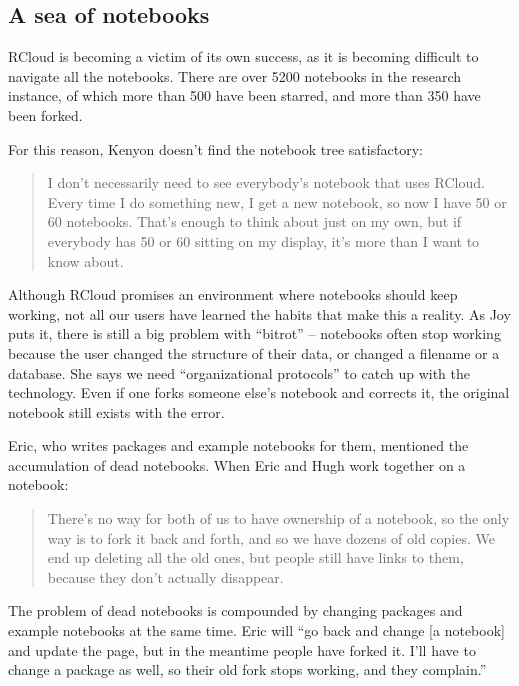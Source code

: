 \subsection{A sea of notebooks}
RCloud is becoming a victim of its own success, as it is becoming
difficult to navigate all the notebooks. There are over 5200 notebooks in
the research instance, of which more than 500 have been starred, and more
than 350 have been forked.

For this reason, Kenyon doesn't find the notebook tree satisfactory:
\begin{quote}
I don't necessarily need to see everybody's notebook that uses RCloud. Every
time I do something new, I get a new notebook, so now I have 50 or 60 notebooks.
That's enough to think about just on my own, but if everybody has
50 or 60 sitting on my display, it's more than I want to know about.
\end{quote}

Although RCloud promises an environment where notebooks should keep working,
not all our users have learned the habits that make this a reality. As Joy
puts it, there is still a big problem with ``bitrot'' -- notebooks often
stop working because the user changed the structure of their data, or
changed a filename or a database. She says we need ``organizational
protocols'' to catch up with the technology. Even if one forks someone
else's notebook and corrects it, the original notebook still exists with
the error.


Eric, who writes packages and example notebooks for them, mentioned the
accumulation of dead notebooks. When Eric and Hugh work together on a notebook:
\begin{quote}
There's no way for both of us to have ownership of a notebook, so the only
way is to fork it back and forth, and so we have dozens of old copies. We
end up deleting all the old ones, but people still have links to them,
because they don't actually disappear.
\end{quote}

The problem of dead notebooks is compounded by changing
packages and example notebooks at the same time. Eric will ``go back and
change [a notebook] and update the page, but in the meantime people
have forked it. I'll have to change a package as well, so their
old fork stops working, and they complain.''


